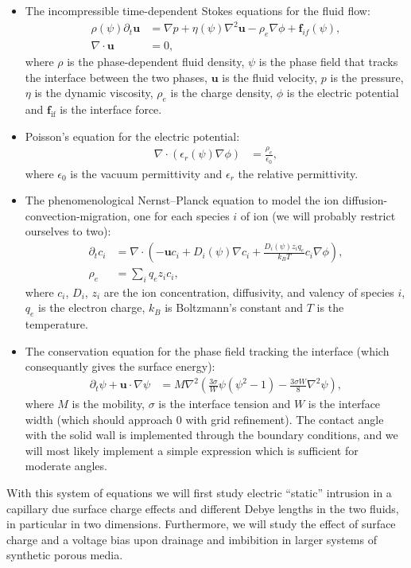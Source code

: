 \documentclass[a4paper,10pt]{article}
\numberwithin{equation}{section}
\numberwithin{figure}{section}
\renewcommand{\v}[1]{\mathbf{#1}}
\newcommand{\intf}{\textrm{if}}
\begin{document}
\begin{itemize} 
\item The incompressible time-dependent Stokes equations for the fluid flow:
  \begin{align}
    \rho(\psi) \partial_t \mathbf{u}  &= \nabla p +\eta(\psi) \nabla^2 \mathbf{u} -  \rho_e  \nabla \phi + \mathbf{f}_{if}(\psi),  \\  
    \nabla \cdot\mathbf{u} &= 0,
  \end{align}
  where $\rho$ is the phase-dependent fluid density, $\psi$ is the phase field that tracks the interface between the two phases, $\v u$ is the fluid velocity, $p$ is the pressure, $\eta$ is the dynamic viscosity, $\rho_e$ is the charge density, $\phi$ is the electric potential and $\v f_{\intf}$ is the interface force.
\item Poisson's equation for the electric potential: 
  \begin{align}
    \nabla\cdot\left(\epsilon_r(\psi)\nabla\phi\right) &= \frac{\rho_e}{\epsilon_0 },
  \end{align}
  where $\epsilon_0$ is the vacuum permittivity and $\epsilon_r$ the relative permittivity.
\item The phenomenological Nernst--Planck equation to model the ion diffusion-convection-migration, one for each species $i$ of ion (we will probably restrict ourselves to two):
  \begin{align}
    \partial_t c_i  &=  \nabla  \cdot  \left( - \mathbf{u} c_i  + D_i(\psi) \nabla c_i  +   \frac{D_i(\psi) z_i q_e}{k_B T} c_i \nabla \phi \right), \\
\rho_e &= \sum_i q_e z_i c_i, 
  \end{align}
  where $c_i$, $D_i$, $z_i$ are the ion concentration, diffusivity, and valency of species $i$, $q_e$ is the electron charge, $k_B$ is Boltzmann's constant and $T$ is the temperature.
\item The conservation equation for the phase field tracking the interface (which consequantly gives the surface energy):
  \begin{align}
    \partial_t \psi + \mathbf{u}\cdot\nabla\psi &= M\nabla^2\left(\frac{3 \sigma }{W} \psi \left(\psi^2 -1\right) - \frac{3 \sigma W}{8}\nabla^2 \psi\right),
  \end{align}
  where $M$ is the mobility, $\sigma$ is the interface tension and $W$ is the interface width (which should approach 0 with grid refinement).
  The contact angle with the solid wall is implemented through the boundary conditions, and we will most likely implement a simple expression which is sufficient for moderate angles.
\end{itemize}
With this system of equations we will first study electric ``static'' intrusion in a capillary due surface charge effects and different Debye lengths in the two fluids, in particular in two dimensions.
Furthermore, we will study the effect of surface charge and a voltage bias upon drainage and imbibition in larger systems of synthetic porous media.
\end{document}
